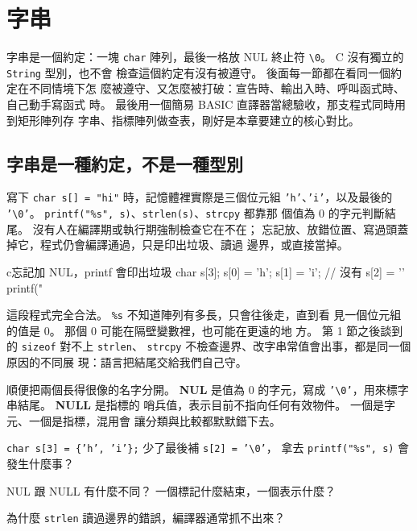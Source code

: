 \chapter{字串}
\label{ch:string}

字串是一個約定：一塊 \texttt{char} 陣列，最後一格放 NUL 終止符
\texttt{\textbackslash 0}。 C 沒有獨立的 \texttt{String} 型別，也不會
檢查這個約定有沒有被遵守。 後面每一節都在看同一個約定在不同情境下怎
麼被遵守、又怎麼被打破：宣告時、輸出入時、呼叫函式時、自己動手寫函式
時。 最後用一個簡易 BASIC 直譯器當總驗收，那支程式同時用到矩形陣列存
字串、指標陣列做查表，剛好是本章要建立的核心對比。

\section{字串是一種約定，不是一種型別}
\label{sec:str-convention}

寫下 \texttt{char s[] = "hi"} 時，記憶體裡實際是三個位元組
\texttt{'h'}、\texttt{'i'}，以及最後的 \texttt{'\textbackslash 0'}。
\texttt{printf("\%s", s)}、\texttt{strlen(s)}、\texttt{strcpy} 都靠那
個值為 $0$ 的字元判斷結尾。 沒有人在編譯期或執行期強制檢查它在不在；
忘記放、放錯位置、寫過頭蓋掉它，程式仍會編譯通過，只是印出垃圾、讀過
邊界，或直接當掉。

\begin{code}{c}{忘記加 NUL，printf 會印出垃圾}
char s[3];
s[0] = 'h';
s[1] = 'i';
// 沒有 s[2] = '\0'
printf("%
\end{code}

這段程式完全合法。 \texttt{\%s} 不知道陣列有多長，只會往後走，直到看
見一個位元組的值是 $0$。 那個 $0$ 可能在隔壁變數裡，也可能在更遠的地
方。 第 1 節之後談到的 \texttt{sizeof} 對不上 \texttt{strlen}、
\texttt{strcpy} 不檢查邊界、改字串常值會出事，都是同一個原因的不同展
現：語言把結尾交給我們自己守。

順便把兩個長得很像的名字分開。 \textbf{NUL} 是值為 $0$ 的字元，寫成
\texttt{'\textbackslash 0'}，用來標字串結尾。 \textbf{NULL} 是指標的
哨兵值，表示目前不指向任何有效物件。 一個是字元、一個是指標，混用會
讓分類與比較都默默錯下去。


\begin{drills}[label=drills:str-convention]
\item \texttt{char s[3] = \{'h', 'i'\};} 少了最後補 \texttt{s[2] = '\textbackslash 0'}，
拿去 \texttt{printf("\%s", s)} 會發生什麼事？
\item NUL 跟 NULL 有什麼不同？ 一個標記什麼結束，一個表示什麼？
\item 為什麼 \texttt{strlen} 讀過邊界的錯誤，編譯器通常抓不出來？
\end{drills}

